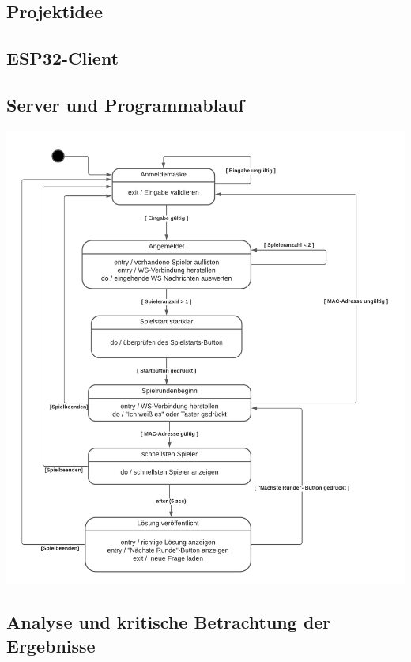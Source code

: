 \documentclass[paper=a0,pagesize,parskip=half-,fontsize=24.88pt, landscape]{scrartcl}
\begin{document}
\begin{multicols*}{3}

  \subsection*{Projektidee}
  \Large
  \subsection*{ESP32-Client}
  \Large
  \subsection*{Server und Programmablauf}
  \Large
  \newline
  
  \begin{center}
    \includegraphics[width=24cm]{abbildungen/Zustandsdiagramm.png}    
  \end{center}
  \subsection*{Analyse und kritische Betrachtung der Ergebnisse}
  \Large

\end{multicols*}
\end{document}
